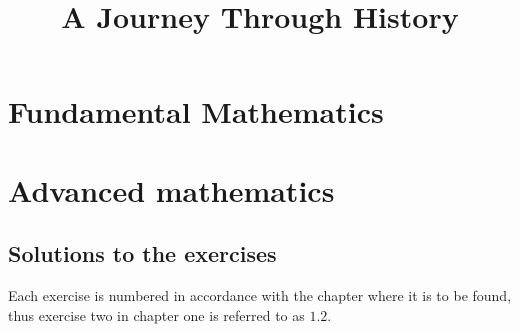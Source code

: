 \documentclass[11pt,twoside,openright]{memoir}
\title{A Journey Through History}
\begin{document}
\let\cleardoublepage\clearpage
\maketitle

\tableofcontents
{}


\mainmatter

\part{Fundamental Mathematics}
















\part{Advanced mathematics}









\appendix
\chapter{Solutions to the exercises}
Each exercise is numbered in accordance with the chapter where it is to be found, thus exercise two in chapter one is referred to as $1.2$.
\shipoutAnswer

\backmatter
\printindex
\end{document}
